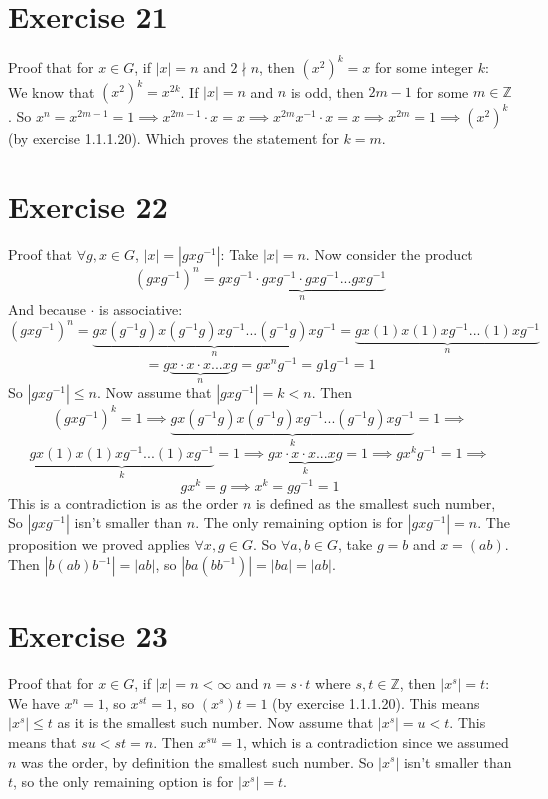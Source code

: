 \documentclass{article}
\newcommand{\Z}{\mathbb{Z}}
\begin{document}
    \section*{Exercise 21}
    Proof that for $x \in G$,
    if $|x| = n$ and $2 \nmid n$,
    then $(x^2)^k = x$ for some integer $k$:
    We know that $(x^2)^k = x^{2k}$.
    If $|x| = n$ and $n$ is odd,
    then $2m - 1$ for some $m \in \Z$.
    So $x^n = x^{2m-1} = 1
    \implies x^{2m-1} \cdot x = x
    \implies x^{2m}x^{-1} \cdot x = x
    \implies x^{2m} = 1
    \implies (x^{2})^{k}$ (by exercise 1.1.1.20).
    Which proves the statement for $k = m$.


    \section*{Exercise 22}
    Proof that $\forall g, x \in G$, $|x| = |gxg^{-1}|$:
    Take $|x| = n$.
    Now consider the product 
    \[(gxg^{-1})^n
    = \underbrace{gxg^{-1} \cdot gxg^{-1} \cdot gxg^{-1} ... gxg^{-1}}_{n}\]
    And because $\cdot$ is associative: 
    \[(gxg^{-1})^n
    = \underbrace{gx(g^{-1}g)x(g^{-1}g)xg^{-1} ... (g^{-1}g)xg^{-1}}_{n}
    = \underbrace{gx(1)x(1)xg^{-1} ... (1)xg^{-1}}_{n}\]
    \[= g\underbrace{x \cdot x \cdot x ... x}_{n}g
    = gx^ng^{-1}
    = g1g^{-1}
    = 1\]
    So $|gxg^{-1}| \leqslant n$.
    Now assume that $|gxg^{-1}| = k < n$.
    Then 
    \[(gxg^{-1})^{k} = 1
    \implies
    \underbrace{gx(g^{-1}g)x(g^{-1}g)xg^{-1} ... (g^{-1}g)xg^{-1}}_{k} = 1
    \implies\]
    \[\underbrace{gx(1)x(1)xg^{-1} ... (1)xg^{-1}}_{k} = 1
    \implies g\underbrace{x \cdot x \cdot x ... x}_{k}g = 1
    \implies gx^kg^{-1} = 1
    \implies\]
    \[gx^k = g
    \implies x^k = gg^{-1} = 1\]
    This is a contradiction is as the order $n$
    is defined as the smallest such number,
    So $|gxg^{-1}|$ isn't smaller than $n$.
    The only remaining option is for $|gxg^{-1}| = n$.
    The proposition we proved applies $\forall x, g \in G$.
    So $\forall a, b \in G$,
    take $g = b$ and $x = (ab)$.
    Then $|b(ab)b^{-1}| = |ab|$,
    so  $|ba(bb^{-1})| = |ba| = |ab|$.


    \section*{Exercise 23}
    Proof that for $x \in G$,
    if $|x| = n < \infty$ and $n = s \cdot t$ where $s, t \in \Z$,
    then $|x^s| = t$: \\
    We have $x^n = 1$,
    so $x^{st} = 1$,
    so $(x^{s}){t} = 1$ (by exercise 1.1.1.20).
    This means $|x^s| \leqslant t$ as it is the smallest such number.
    Now assume that $|x^s| = u < t$.
    This means that $su < st = n$.
    Then $x^{su} = 1$,
    which is a contradiction since we assumed $n$ was the order,
    by definition the smallest such number.
    So $|x^s|$ isn't smaller than $t$,
    so the only remaining option is for $|x^s| = t$.
    
\end{document}
